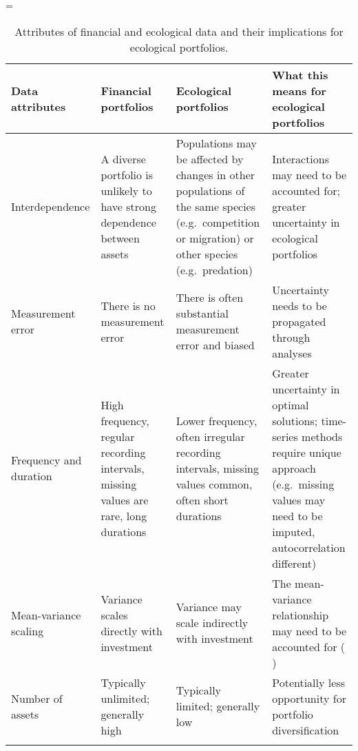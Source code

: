 \LTcapwidth=\textwidth
\begin{footnotesize}

\begin{longtable}{>{\RaggedRight}p{2.4cm}>{\RaggedRight}p{3.3cm}>{\RaggedRight}p{3.9cm}>{\RaggedRight}p{3.9cm}}

\caption{Attributes of financial and ecological data and their implications for ecological portfolios.}\\
\toprule

\textbf{Data attributes} &
\textbf{Financial portfolios} &
\textbf{Ecological portfolios} &
\textbf{What this means for ecological portfolios}\\

\midrule

Interdependence &
A diverse portfolio is unlikely to have strong dependence between assets &
Populations may be affected by changes in other populations of the same species (e.g.\ competition or migration) or other species (e.g.\ predation) &
Interactions may need to be accounted for; greater uncertainty in ecological
portfolios\\

Measurement error &
There is no measurement error &
There is often substantial measurement error and biased &
Uncertainty needs to be propagated through analyses\\

Frequency and duration &
High frequency, regular recording intervals, missing values are rare, long durations &
Lower frequency, often irregular recording intervals, missing values common, often short durations &
Greater uncertainty in optimal solutions; time-series methods require unique approach (e.g.\ missing values may need to be imputed, autocorrelation different)\\


Mean-variance scaling &
Variance scales directly with investment &
Variance may scale indirectly with investment &
The mean-variance relationship may need to be accounted for (\citeauthor{anderson2013} \citeyear{anderson2013})\\

Number of assets &
Typically unlimited; generally high &
Typically limited; generally low &
Potentially less opportunity for portfolio diversification\\

\bottomrule
\label{tab:data}
\end{longtable}
\end{footnotesize}
